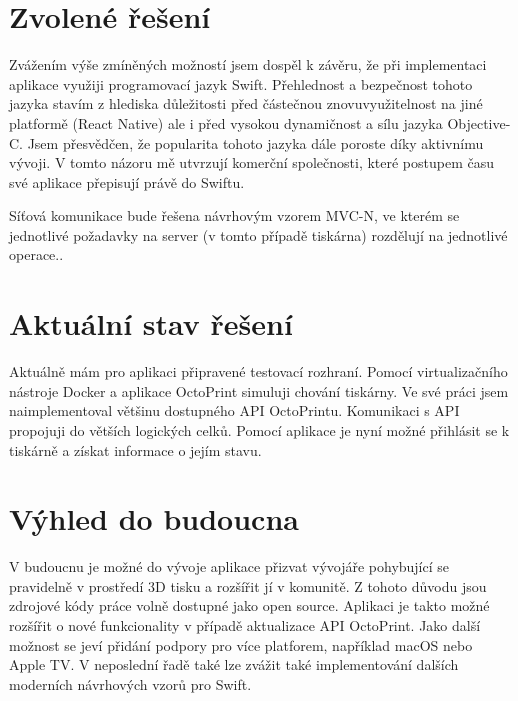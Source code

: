 \documentclass[czech]{article}
\begin{document}
\section{Zvolené řešení}

Zvážením výše zmíněných možností jsem dospěl k závěru, že při implementaci aplikace využiji programovací jazyk Swift. Přehlednost a bezpečnost tohoto jazyka stavím z hlediska důležitosti před částečnou znovuvyužitelnost na jiné platformě (React Native) ale i před vysokou dynamičnost a sílu jazyka Objective-C. Jsem přesvědčen, že popularita tohoto jazyka dále poroste díky aktivnímu vývoji. V tomto názoru mě utvrzují komerční společnosti, které postupem času své aplikace přepisují právě do Swiftu.

Síťová komunikace bude řešena návrhovým vzorem MVC-N, ve kterém se jednotlivé požadavky na server (v tomto případě tiskárna) rozdělují na jednotlivé operace.\cite{mvcn}.

\section{Aktuální stav řešení}

Aktuálně mám pro aplikaci připravené testovací rozhraní. Pomocí virtualizačního nástroje Docker a aplikace OctoPrint simuluji chování tiskárny. Ve své práci jsem naimplementoval většinu dostupného API OctoPrintu\cite{octoprint}. Komunikaci s API propojuji do větších logických celků. Pomocí aplikace je nyní možné přihlásit se k tiskárně a získat informace o jejím stavu.

\section{Výhled do budoucna}

V budoucnu je možné do vývoje aplikace přizvat vývojáře pohybující se pravidelně v prostředí 3D tisku a rozšířit jí v komunitě. Z tohoto důvodu jsou zdrojové kódy práce volně dostupné jako open source. Aplikaci je takto možné rozšířit o nové funkcionality v případě aktualizace API OctoPrint. Jako další možnost se jeví přidání podpory pro více platforem, například macOS nebo Apple TV. V neposlední řadě také lze zvážit také implementování dalších moderních návrhových vzorů pro Swift\cite{design-patterns}.
\end{document}
